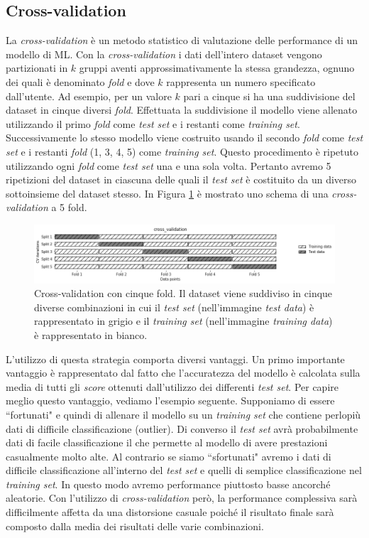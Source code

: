 \documentclass[12pt,italian]{report}
\begin{document}
\subsection{Cross-validation}
La \emph{cross-validation} è un metodo statistico di valutazione delle performance di un modello di ML. Con la \emph{cross-validation} i dati dell'intero dataset vengono partizionati in $k$ gruppi aventi approssimativamente la stessa grandezza, ognuno dei quali è denominato \emph{fold} e dove $k$ rappresenta un numero specificato dall'utente. Ad esempio, per un valore $k$ pari a cinque si ha una suddivisione del dataset in cinque diversi \emph{fold}. Effettuata la suddivisione il modello viene allenato utilizzando il primo \emph{fold} come \emph{test set} e i restanti come \emph{training set}. Successivamente lo stesso modello viene costruito usando il secondo \emph{fold} come \emph{test set} e i restanti \emph{fold} (1, 3, 4, 5) come \emph{training set}. Questo procedimento è ripetuto utilizzando ogni \emph{fold} come \emph{test set} una e una sola volta. Pertanto avremo 5 ripetizioni del dataset in ciascuna delle quali il \emph{test set} è costituito da un diverso sottoinsieme del dataset stesso.
In Figura \ref{fig:cv} è mostrato uno schema di una \emph{cross-validation} a 5 fold.

\begin{figure}[h!]
	\center
	\includegraphics[scale=0.5]{../img/cv} %
	\caption{Cross-validation con cinque fold. Il dataset viene suddiviso in cinque diverse combinazioni in cui il \emph{test set} (nell'immagine \emph{test data}) è rappresentato in grigio e il \emph{training set} (nell'immagine \emph{training data}) è rappresentato in bianco.}
	\label{fig:cv}
\end{figure}

L'utilizzo di questa strategia comporta diversi vantaggi. Un primo importante vantaggio è rappresentato dal fatto che l'accuratezza del modello è calcolata sulla media di tutti gli \emph{score} ottenuti dall'utilizzo dei differenti \emph{test set}. Per capire meglio questo vantaggio, vediamo l'esempio seguente. Supponiamo di essere ``fortunati" e quindi di allenare il modello su un \emph{training set} che contiene perlopiù dati di difficile classificazione (outlier). Di converso il \emph{test set} avrà probabilmente dati di facile classificazione il che permette al modello di avere prestazioni casualmente molto alte. Al contrario se siamo ``sfortunati" avremo i dati di difficile classificazione all'interno del \emph{test set} e quelli di semplice classificazione nel \emph{training set}. In questo modo avremo performance piuttosto basse ancorché aleatorie.
Con l'utilizzo di \emph{cross-validation} però, la performance complessiva sarà difficilmente affetta da una distorsione casuale poiché il risultato finale sarà composto dalla media dei risultati delle varie combinazioni.
\end{document}
